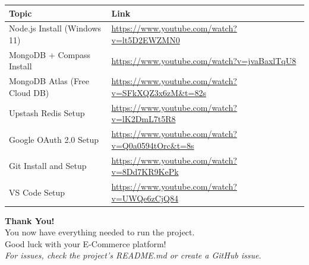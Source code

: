 \documentclass[12pt,a4paper]{article}
\begin{document}
\begin{longtable}{p{4cm} p{8cm}}
    \toprule
    \textbf{Topic} & \textbf{Link} \\
    \midrule
    Node.js Install (Windows 11) & \url{https://www.youtube.com/watch?v=lt5D2EWZMN0} \\
    MongoDB + Compass Install & \url{https://www.youtube.com/watch?v=jvaBaxlTqU8} \\
    MongoDB Atlas (Free Cloud DB) & \url{https://www.youtube.com/watch?v=SFkXQZ3x6zM&t=82s} \\
    Upstash Redis Setup & \url{https://www.youtube.com/watch?v=lK2DmL7t5R8} \\
    Google OAuth 2.0 Setup & \url{https://www.youtube.com/watch?v=Q0a0594tOrc&t=8s} \\
    Git Install and Setup & \url{https://www.youtube.com/watch?v=8Dd7KR9KePk} \\
    VS Code Setup & \url{https://www.youtube.com/watch?v=UWQe6zCjQ84} \\
    \bottomrule
\end{longtable}

\vspace{1cm}

\begin{center}
\begin{tcolorbox}[colback=infobox,colframe=primaryblue,width=0.8\textwidth]
    \centering
    \Large\textbf{Thank You!}\\[0.3cm]
    \large You now have everything needed to run the project.\\
    Good luck with your E-Commerce platform! \\[0.3cm]
    \small \textit{For issues, check the project's README.md or create a GitHub issue.}
\end{tcolorbox}
\end{center}
\end{document}
